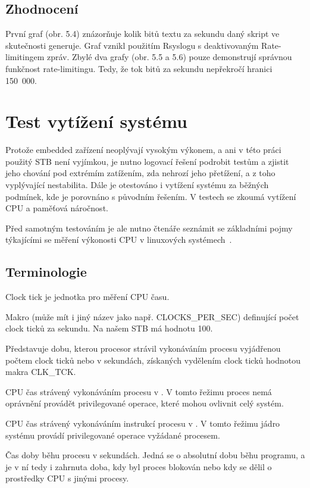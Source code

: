 \documentclass[thesis=B,czech]{FITthesis}[2012/06/26]
\begin{document}
\subsection{Zhodnocení}
První graf (obr. 5.4) znázorňuje kolik bitů textu za sekundu daný skript ve skutečnosti generuje. Graf vznikl použitím Rsyslogu s deaktivovaným Rate-limitingem zpráv.
Zbylé dva grafy (obr. 5.5 a 5.6) pouze demonstrují správnou funkčnost rate-limitingu. Tedy, že tok bitů za sekundu nepřekročí hranici 150~000.

\section{Test vytížení systému}
Protože embedded zařízení neoplývají vysokým výkonem, a ani v této práci použitý STB není vyjímkou, je nutno logovací řešení podrobit testům a zjistit jeho chování pod extrémím zatížením, zda nehrozí jeho přetížení, a z toho vyplývající nestabilita. Dále je otestováno i vytížení systému za běžných podmínek, kde je porovnáno s původním řešením. V testech se zkoumá vytížení CPU a paměťová náročnost.

Před samotným testováním je ale nutno čtenáře seznámit se základními pojmy týkajícími se měření výkonosti CPU v linuxových systémech~\cite{MeasuringPerformance}.

\subsection{Terminologie}

\begin{description}
\setlength\itemsep{-1ex}
	\item [Clock tick:] Clock tick je jednotka pro měření CPU času.
	\item [CLK\_TCK:] Makro (může mít i jiný název jako např. CLOCKS\_PER\_SEC) definující počet clock ticků za sekundu. Na našem STB má hodnotu 100.
	\item [CPU time (CPU čas):] Představuje dobu, kterou procesor strávil vykonáváním procesu vyjádřenou počtem clock ticků nebo v sekundách, získaných vydělením clock ticků hodnotou makra CLK\_TCK.
	\item [User time:] CPU čas strávený vykonáváním procesu v . V tomto řežimu proces nemá oprávnění provádět privilegované operace, které mohou ovlivnit celý systém.
	\item [System time:] CPU čas strávený vykonáváním instrukcí procesu v . V tomto řežimu jádro systému provádí privilegované operace vyžádané procesem.
	\item [Real time:] Čas doby běhu procesu v sekundách. Jedná se o absolutní dobu běhu programu, a je v ní tedy i zahrnuta doba, kdy byl proces blokován nebo kdy se dělil o prostředky CPU s jinými procesy.
	\end{description}
\end{document}
